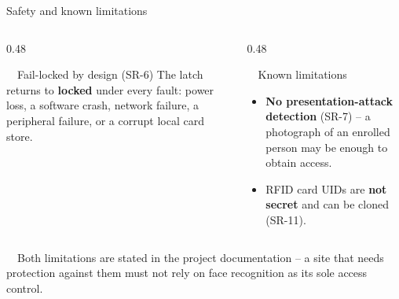 \documentclass[aspectratio=169, 10pt]{beamer}
\begin{document}
\begin{frame}{Safety and known limitations}
  \begin{columns}[T]
    \begin{column}{0.48\textwidth}
      \begin{card}{\faCheckCircle~~Fail-locked by design (SR-6)}
        \scriptsize The latch returns to \textbf{locked} under every fault: power loss, a software crash, network failure, a peripheral failure, or a corrupt local card store.
      \end{card}
    \end{column}
    \begin{column}{0.48\textwidth}
      \begin{alertcard}{\faExclamationTriangle~~Known limitations}
        \scriptsize
        \begin{itemize}
          \item \textbf{No presentation-attack detection} (SR-7) -- a photograph of an enrolled person may be enough to obtain access.
          \item RFID card UIDs are \textbf{not secret} and can be cloned (SR-11).
        \end{itemize}
      \end{alertcard}
    \end{column}
  \end{columns}
  \vspace{0.6em}
  \centering
  \begin{notebar}
    \faTasks~~Both limitations are stated in the project documentation -- a site that needs protection against them must not rely on face recognition as its sole access control.
  \end{notebar}
\end{frame}

\end{document}
